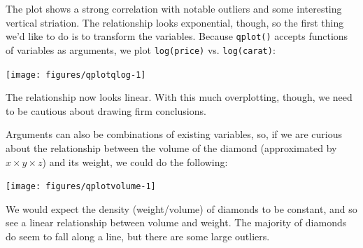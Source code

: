 The plot shows a strong correlation with notable outliers and some
interesting vertical striation. The relationship looks exponential,
though, so the first thing we'd like to do is to transform the
variables. Because \texttt{qplot()} accepts functions of variables as
arguments, we plot \texttt{log(price)} vs. \texttt{log(carat)}:

\begin{Shaded}
\begin{Highlighting}[]
\NormalTok{>}\StringTok{ }\NormalTok{(} 
\end{Highlighting}
\end{Shaded}

\begin{flushleft}\texttt{[image: figures/qplotqlog-1]} \end{flushleft}

\noindent The relationship now looks linear. With this much
overplotting, though, we need to be cautious about drawing firm
conclusions.

Arguments can also be combinations of existing variables, so, if we are
curious about the relationship between the volume of the diamond
(approximated by \(x \times y \times z\)) and its weight, we could do
the following:

\begin{Shaded}
\begin{Highlighting}[]
\NormalTok{>}\StringTok{ }\StringTok{ }\StringTok{ } 
\end{Highlighting}
\end{Shaded}

\begin{flushleft}\texttt{[image: figures/qplotvolume-1]} \end{flushleft}

We would expect the density (weight/volume) of diamonds to be constant,
and so see a linear relationship between volume and weight. The majority
of diamonds do seem to fall along a line, but there are some large
outliers.


